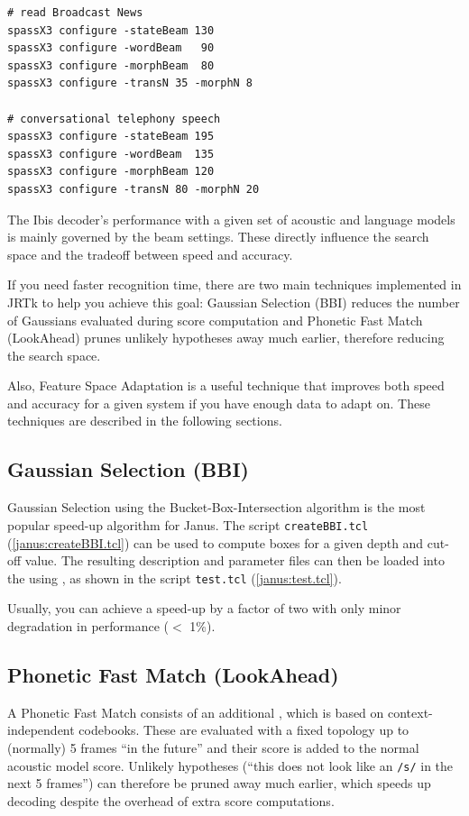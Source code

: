 \begin{verbatim}
# read Broadcast News
spassX3 configure -stateBeam 130
spassX3 configure -wordBeam   90
spassX3 configure -morphBeam  80
spassX3 configure -transN 35 -morphN 8

# conversational telephony speech
spassX3 configure -stateBeam 195
spassX3 configure -wordBeam  135
spassX3 configure -morphBeam 120
spassX3 configure -transN 80 -morphN 20
\end{verbatim}

The  Ibis  decoder's  performance with  a  given set  of  acoustic and
language models   is   mainly governed by   the   beam settings. These
directly influence the search space and the tradeoff between speed and
accuracy.

If you  need faster recognition  time, there  are  two main techniques
implemented in JRTk to help  you achieve this goal: Gaussian Selection
(BBI)   reduces  the   number  of  Gaussians  evaluated   during score
computation  and   Phonetic Fast   Match (LookAhead)  prunes  unlikely
hypotheses away much earlier, therefore reducing the search space.

Also, Feature Space Adaptation   is a useful technique  that  improves
both speed and accuracy for a given system if you  have enough data to
adapt on. These techniques are described in the following sections.

\subsection{Gaussian Selection (BBI)}

Gaussian Selection using the Bucket-Box-Intersection algorithm
\cite{fritsch:icassp96} is the most popular speed-up algorithm for
Janus.   The script \texttt{createBBI.tcl} (\ref{janus:createBBI.tcl})
can be used to compute boxes for a given depth  and cut-off value. The
resulting description and parameter files can then be loaded into the
 using  , as shown in
the script \texttt{test.tcl} (\ref{janus:test.tcl}).

Usually, you can achieve a speed-up by a factor of two with only minor
degradation in performance ($<$ 1\%).

\subsection{Phonetic Fast Match (LookAhead)}

A    Phonetic    Fast   Match      consists   of     an     additional
,   which is    based   on context-independent
codebooks. These are evaluated with a fixed  topology up to (normally)
5 frames ``in  the future''  and their  score is  added to the  normal
acoustic model score. Unlikely hypotheses  (``this does not look  like
an \texttt{/s/} in  the next 5 frames'') can  therefore be pruned away
much earlier, which  speeds up decoding  despite the overhead of extra
score computations.

